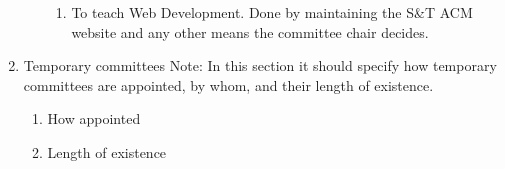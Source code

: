 \begin{enumerate}[label=\Alph*.]
\begin{enumerate}
\begin{enumerate}
          \item To teach Web Development. Done by maintaining the S\&T ACM
          website and any other means the committee chair decides.
        \end{enumerate}
    \end{enumerate}
  \item Temporary committees Note:  In this section it should specify how
  temporary committees are appointed, by whom, and their length of existence.
    \begin{enumerate}
      \item How appointed
      \item Length of existence
    \end{enumerate}
\end{enumerate}

